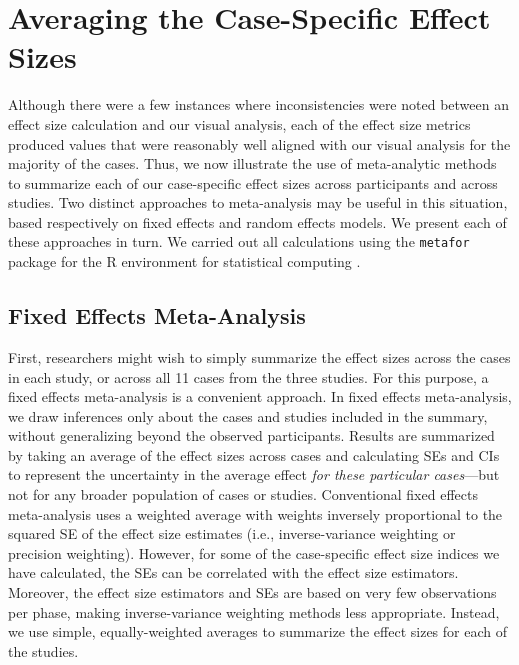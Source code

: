 \documentclass[
]{book}
\begin{document}
\hypertarget{averaging-the-case-specific-effect-sizes}{%
\section{Averaging the Case-Specific Effect Sizes}\label{averaging-the-case-specific-effect-sizes}}

Although there were a few instances where inconsistencies were noted between an effect size calculation and our visual analysis, each of the effect size metrics produced values that were reasonably well aligned with our visual analysis for the majority of the cases. Thus, we now illustrate the use of meta-analytic methods to summarize each of our case-specific effect sizes across participants and across studies. Two distinct approaches to meta-analysis may be useful in this situation, based respectively on fixed effects and random effects models. We present each of these approaches in turn. We carried out all calculations using the \texttt{metafor} package \citep{viechtbauer2010conducting} for the R environment for statistical computing \citep{RTeam}.

\hypertarget{fixed-effects-meta-analysis}{%
\subsection{Fixed Effects Meta-Analysis}\label{fixed-effects-meta-analysis}}

First, researchers might wish to simply summarize the effect sizes across the cases in each study, or across all 11 cases from the three studies. For this purpose, a fixed effects meta-analysis is a convenient approach. In fixed effects meta-analysis, we draw inferences only about the cases and studies included in the summary, without generalizing beyond the observed participants. Results are summarized by taking an average of the effect sizes across cases and calculating SEs and CIs to represent the uncertainty in the average effect \emph{for these particular cases}---but not for any broader population of cases or studies. Conventional fixed effects meta-analysis uses a weighted average with weights inversely proportional to the squared SE of the effect size estimates (i.e., inverse-variance weighting or precision weighting). However, for some of the case-specific effect size indices we have calculated, the SEs can be correlated with the effect size estimators. Moreover, the effect size estimators and SEs are based on very few observations per phase, making inverse-variance weighting methods less appropriate. Instead, we use simple, equally-weighted averages to summarize the effect sizes for each of the studies.
\end{document}

